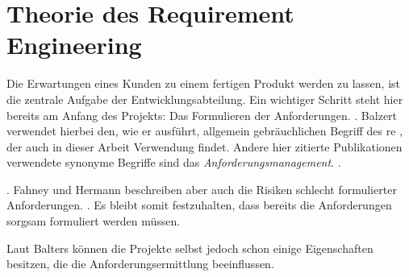 \section{Theorie des Requirement Engineering}


Die Erwartungen eines Kunden zu einem fertigen Produkt werden zu lassen, ist die zentrale Aufgabe der Entwicklungsabteilung. Ein wichtiger Schritt steht hier bereits am Anfang des Projekts: Das Formulieren der Anforderungen.
 \citep[][434]{Balzert2010}. 
Balzert verwendet hierbei den, wie er ausführt, allgemein gebräuchlichen Begriff des \ac{re} \citep[vgl.][434]{Balzert2010}, der auch in dieser Arbeit Verwendung findet. Andere hier zitierte Publikationen verwendete synonyme Begriffe sind \zb das \textit{Anforderungsmanagement}.
 \citep[][6]{Grande2014}.

 \citep[Fahney und Hermann in][10]{Herrmann2013}.
Fahney und Hermann beschreiben aber auch die Risiken schlecht formulierter Anforderungen.  \citep[Fahney und Hermann in][10]{Herrmann2013}. 
Es bleibt somit festzuhalten, dass bereits die Anforderungen sorgsam formuliert werden müssen.

Laut Balters können die Projekte selbst jedoch schon einige Eigenschaften besitzen, die die Anforderungsermittlung beeinflussen. 

